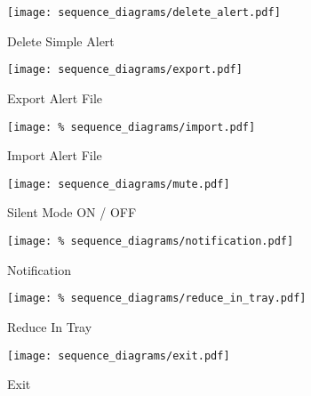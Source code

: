 \begin{figure}[]
	\centering
    \caption{Delete Simple Alert}\label{fig:sd_delete_simple_alert}
    \texttt{[image: sequence\_diagrams/delete\_alert.pdf]}
\end{figure}

\begin{figure}[]
	\centering
    \caption{Export Alert File}\label{fig:sd_export_alert_file}
    \texttt{[image: sequence\_diagrams/export.pdf]}
\end{figure}

\begin{figure}[]
	\centering
    \caption{Import Alert File}\label{fig:sd_import_alert_file}
    \texttt{[image: \%
    sequence\_diagrams/import.pdf]}
\end{figure}

\begin{figure}[]
	\centering
    \caption{Silent Mode ON / OFF}\label{fig:sd_silent_mode}
	\texttt{[image: sequence\_diagrams/mute.pdf]}
\end{figure}

\begin{figure}[]
	\centering
    \caption{Notification}\label{fig:sd_notification}
	\texttt{[image: \%
    sequence\_diagrams/notification.pdf]}
\end{figure}

\begin{figure}[]
	\centering
    \caption{Reduce In Tray}\label{fig:sd_reduce_in_tray}
	\texttt{[image: \%
    sequence\_diagrams/reduce\_in\_tray.pdf]}
\end{figure}

\begin{figure}[]
	\centering
    \caption{Exit}\label{fig:sd_exit}
	\texttt{[image: sequence\_diagrams/exit.pdf]}
\end{figure}
